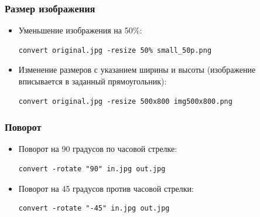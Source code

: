 \documentclass[11pt, compress]{beamer}
\begin{document}
\begin{frame}[c, fragile]
\frametitle{Размер изображения}
\begin{itemize}
	\item Уменьшение изображения на 50\%:
\begin{lstlisting}
convert original.jpg -resize 50% small_50p.png
\end{lstlisting}
	\item Изменение размеров с указанием ширины и высоты (изображение вписывается в заданный прямоугольник): 
\begin{lstlisting}
convert original.jpg -resize 500x800 img500x800.png
\end{lstlisting}
\end{itemize}
\end{frame}

\begin{frame}[c, fragile]
\frametitle{Поворот}
\begin{itemize}
	\item Поворот на 90 градусов по часовой стрелке:
\begin{lstlisting}
convert -rotate "90" in.jpg out.jpg
\end{lstlisting}
	\item Поворот на 45 градусов против часовой стрелки:
\begin{lstlisting}
convert -rotate "-45" in.jpg out.jpg
\end{lstlisting}
\end{itemize}
\end{frame}
\end{document}
